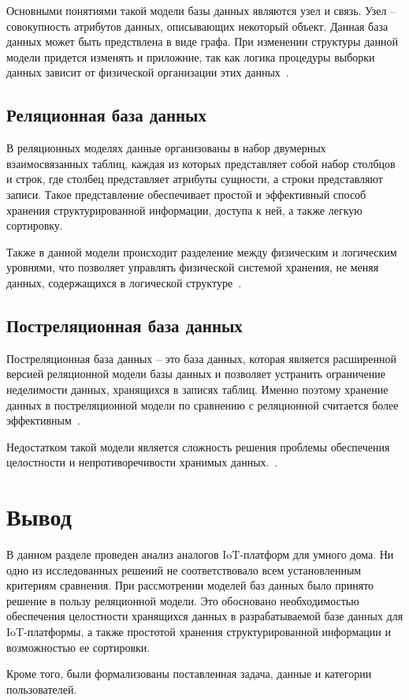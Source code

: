 Основными понятиями такой модели базы данных являются узел и связь. Узел -- совокупность атрибутов данных, описывающих
некоторый объект. Данная база данных может быть предствлена в виде графа. При изменении структуры данной модели придется 
изменять и приложние, так как логика процедуры выборки данных зависит от физической организации этих данных~\cite{petr}.

\subsection{Реляционная база данных}
В реляционных моделях данные организованы в набор двумерных взаимосвязанных таблиц, 
каждая из которых представляет собой набор столбцов и строк, где столбец представляет атрибуты сущности, 
а строки представляют записи. Такое представление обеспечивает простой и эффективный способ хранения структурированной информации, 
доступа к ней, а также легкую сортировку.

Также в данной модели происходит разделение между физическим и логическим уровнями, что 
позволяет управлять физической системой хранения, не меняя данных, содержащихся в логической структуре~\cite{oracle}.

\subsection{Постреляционная база данных}

Постреляционная база данных -- это база данных, которая является расширенной версией реляционной 
модели базы данных и позволяет устранить ограничение неделимости данных, хранящихся 
в записях таблиц. Именно поэтому хранение данных в постреляционной модели по сравнению 
с реляционной считается более эффективным~\cite{fedor}.

Недостатком такой модели является сложность решения проблемы обеспечения целостности и непротиворечивости хранимых данных.~\cite{microsoft}.

\section*{Вывод}

В данном разделе проведен анализ аналогов IoT-платформ для умного дома.
Ни одно из исследованных решений не соответствовало всем установленным критериям сравнения. 
При рассмотрении моделей баз данных было принято решение в пользу реляционной модели. 
Это обосновано необходимостью обеспечения целостности хранящихся данных в разрабатываемой базе данных 
для IoT-платформы, а также простотой хранения структурированной информации и возможностью ее сортировки.

Кроме того, были формализованы поставленная задача, данные и категории пользователей.
